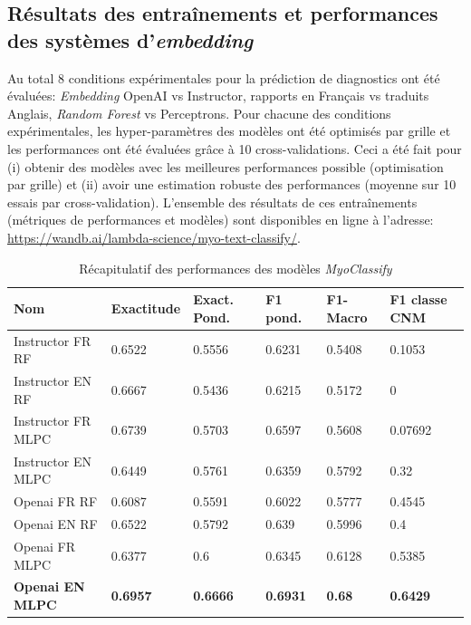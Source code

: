 \subsection{Résultats des entraînements et performances des systèmes d'\textit{embedding}}
Au total 8 conditions expérimentales pour la prédiction de diagnostics ont été évaluées: \textit{Embedding} OpenAI vs Instructor, rapports en Français vs traduits Anglais, \textit{Random Forest} vs Perceptrons. Pour chacune des conditions expérimentales, les hyper-paramètres des modèles ont été optimisés par grille et les performances ont été évaluées grâce à 10 cross-validations. Ceci a été fait pour (i) obtenir des modèles avec les meilleures performances possible (optimisation par grille) et (ii) avoir une estimation robuste des performances (moyenne sur 10 essais par cross-validation). L'ensemble des résultats de ces entraînements (métriques de performances et modèles) sont disponibles en ligne à l'adresse: \href{https://wandb.ai/lambda-science/myo-text-classify/}{https://wandb.ai/lambda-science/myo-text-classify/}. 
\begin{table}[ht]
\centering
\caption{Récapitulatif des performances des modèles \textit{MyoClassify}}
\label{tab:myoclassify_metrics}
\begin{tabularx}{\textwidth}{|X|X|X|X|X|X|}
\toprule
\textbf{Nom} & \textbf{Exactitude} & \textbf{Exact. Pond.} & \textbf{F1 pond.} & \textbf{F1-Macro} & \textbf{F1 classe CNM} \\\hline
Instructor FR RF & 0.6522 & 0.5556 & 0.6231 & 0.5408 & 0.1053 \\ \hline
Instructor EN RF & 0.6667 & 0.5436 & 0.6215 & 0.5172 & 0 \\ \hline
Instructor FR MLPC & 0.6739 & 0.5703 & 0.6597 & 0.5608 & 0.07692 \\ \hline
Instructor EN MLPC & 0.6449 & 0.5761 & 0.6359 & 0.5792 & 0.32 \\ \hline
Openai FR RF & 0.6087 & 0.5591 & 0.6022 & 0.5777 & 0.4545 \\ \hline
Openai EN RF & 0.6522 & 0.5792 & 0.639 & 0.5996 & 0.4 \\ \hline
Openai FR MLPC & 0.6377 & 0.6 & 0.6345 & 0.6128 & 0.5385 \\ \hline
\textbf{Openai EN MLPC} & \textbf{0.6957} &\textbf{0.6666}& \textbf{0.6931} &\textbf{ 0.68} & \textbf{0.6429} \\ \hline
\end{tabularx}
\end{table}
